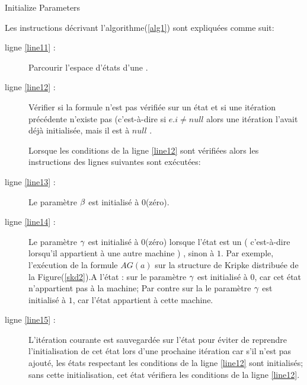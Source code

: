 \begin{algorithm}[H]\label{alg1}
\SetAlgoLined
{}
 \caption{Initialize Parameters}
\end{algorithm}
Les instructions décrivant l'algorithme(\ref{alg1}) sont expliquées comme suit:
\begin{description}
	\item[ligne \ref{line11} :] Parcourir l'espace d'états d'une \mi{}.
	\item[ligne \ref{line12} :] Vérifier si la formule n'est pas vérifiée sur un état et si une itération précédente n'existe pas (c'est-à-dire si $ e.i\ne null$ alors une itération l'avait déjà initialisée, mais il est à $ null$ . 
	
	Lorsque les conditions de la ligne \ref{line12} sont vérifiées alors les instructions des lignes suivantes sont exécutées:
	\item[ligne \ref{line13} :] Le paramètre $\beta{}$ est initialisé à $0$(zéro).
	\item[ligne \ref{line14} :] Le paramètre $\gamma{}$ est initialisé à $0$(zéro) lorsque l'état est un \textsl{\border{}} ( c'est-à-dire lorsqu'il appartient à une autre machine ) , sinon à $1$. Par exemple, l'exécution de la formule  \textit{$AG(a)$} sur la structure de Kripke distribuée de la Figure(\ref{skd2}).A l'état \sneuf{} : sur \mone{}  le paramètre $\gamma{}$ est initialisé à $0$, car cet état n'appartient pas à la machine;  Par contre sur la \mtwo{} le paramètre $\gamma{}$ est initialisé à $1$, car l'état appartient à cette machine.
	\item[ligne \ref{line15} :] L'itération courante est sauvegardée sur l'état pour éviter de reprendre l'initialisation de cet état lors d'une prochaine itération car s'il n'est pas ajouté, les états respectant les conditions de la ligne \ref{line12} sont initialisés; sans cette initialisation, cet état vérifiera les conditions de la ligne \ref{line12}. 
\end{description}
